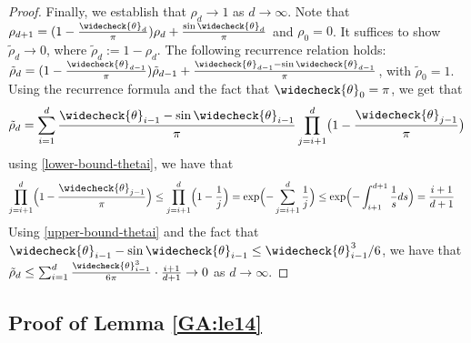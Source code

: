 \documentclass[11pt]{article}
\newcommand{\rhotilde}{\tilde{\rho}}
\newcommand{\thetacheck}{\widecheck{\theta}}
\begin{document}
\begin{proof}
Finally, we establish that $\rho_d\to 1$ as $d \to \infty$.  Note that $\rho_{d+1} = (1 - \frac{\thetacheck_d}{\pi}) \rho_d + \frac{\sin \thetacheck_d}{\pi}$  and $\rho_0 = 0$.  It suffices to show $\rhotilde_d \to 0$, where $\rhotilde_d := 1 - \rho_d$.  The following recurrence relation holds: $\rhotilde_d = (1 - \frac{\thetacheck_{d-1}}{\pi}) \rhotilde_{d-1} + \frac{\thetacheck_{d-1} - \sin \thetacheck_{d-1}}{\pi}$, with $\rhotilde_0=1$.  Using the recurrence formula \cite[Eq.~(15)]{hand_global_2017}  and the fact that $\thetacheck_0=\pi$, we get that
\begin{align}
\rhotilde_d =  \sum_{i=1}^d \frac{\thetacheck_{i-1} - \sin \thetacheck_{i-1}}{\pi} \prod_{j=i+1}^d \bigl(1 - \frac{\thetacheck_{j-1}}{\pi} \bigr)
\end{align}
using \eqref{lower-bound-thetai}, we have that
\begin{align*}
\prod_{j=i+1}^d \Bigl(1 - \frac{\thetacheck_{j-1}}{\pi} \Bigr) &\leq \prod_{j=i+1}^d \Bigl(1 - \frac{1}{j} \Bigr)
= \exp \Bigl( -\sum_{j = i+1}^d \frac{1}{j}  \Bigr) \leq \exp \Bigl( - \int_{i+1}^{d+1} \frac{1}{s} ds  \Bigr) = \frac{i+1}{d+1}
\end{align*}
Using \eqref{upper-bound-thetai} and the fact that $\thetacheck_{i-1} - \sin \thetacheck_{i-1} \leq \thetacheck_{i-1}^3 / 6$, we have that $\rhotilde_d \leq \sum_{i=1}^d \frac{\thetacheck_{i-1}^3}{6\pi}\cdot  \frac{i+1}{d+1} \to 0$ as $d \to \infty$.


\end{proof}





\subsection{Proof of
Lemma \ref{GA:le14}}
\end{document}
